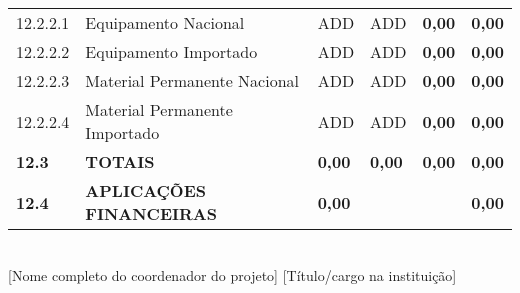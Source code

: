 \begin{table}[h]
{\begin{tabular}{|l|l|l|l|l|l|}
    12.2.2.1 & 
    Equipamento Nacional & 
    ADD & 
    ADD &
    \textbf{0,00} &
    \textbf{0,00} \\ 
       
    \rowcolor{Gainsboro!60}
    12.2.2.2 & 
    Equipamento Importado & 
    ADD & 
    ADD &
    \textbf{0,00} &
    \textbf{0,00} \\ 

    12.2.2.3 & 
    Material Permanente Nacional & 
    ADD & 
    ADD &
    \textbf{0,00} &
    \textbf{0,00} \\ 

    \rowcolor{Gainsboro!60}
    12.2.2.4 & 
    Material Permanente Importado & 
    ADD & 
    ADD &
    \textbf{0,00} &
    \textbf{0,00} \\ \hline

    \rowcolor{blue!40} \textbf{12.3} & 
    \textbf{TOTAIS} & 
    \textbf{0,00} & 
    \textbf{0,00} & 
    \textbf{0,00} & 
    \textbf{0,00} \\ \hline\hline

    \rowcolor{blue!40} \textbf{12.4} & 
    \textbf{APLICAÇÕES FINANCEIRAS} & 
    \multicolumn{3}{|l||}{\textbf{0,00}} & 
    \textbf{0,00} \\ \hline
    
\end{tabular}}
\end{table}


\vspace{1cm}


\vspace{1cm}
\underline{\hspace{10cm}} \\[1em] %
[Nome completo do coordenador do projeto] [Título/cargo na instituição]